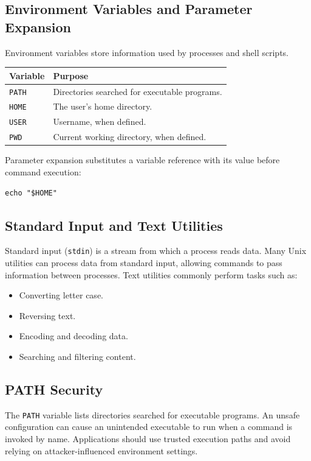 \documentclass[12pt,a4paper]{article}
\newcommand{\nsubsection}[1]{\subsection{#1}}
\begin{document}
\vspace{0.5cm}
\nsubsection{Environment Variables and Parameter Expansion}

Environment variables store information used by processes
and shell scripts.

\begin{longtable}{>{\raggedright\arraybackslash}p{}
        >{\raggedright\arraybackslash}p{}}
    \toprule
    \textbf{Variable} & \textbf{Purpose}                              \\
    \midrule
    \texttt{PATH}     & Directories searched for executable programs. \\
    \texttt{HOME}     & The user's home directory.                    \\
    \texttt{USER}     & Username, when defined.                       \\
    \texttt{PWD}      & Current working directory, when defined.      \\
    \bottomrule
\end{longtable}

Parameter expansion substitutes a variable reference with its
value before command execution:

\begin{lstlisting}
echo "$HOME"
\end{lstlisting}

\vspace{0.5cm}
\nsubsection{Standard Input and Text Utilities}

Standard input (\texttt{stdin}) is a stream from which a process
reads data. Many Unix utilities can process data from standard
input, allowing commands to pass information between processes.
Text utilities commonly perform tasks such as:

\begin{itemize}
    \item Converting letter case.
    \item Reversing text.
    \item Encoding and decoding data.
    \item Searching and filtering content.
\end{itemize}

\vspace{0.5cm}
\nsubsection{PATH Security}

The \texttt{PATH} variable lists directories searched for
executable programs.
An unsafe configuration can cause an unintended executable
to run when a command is invoked by name. Applications should
use trusted execution paths and avoid relying on
attacker-influenced environment settings.
\end{document}
